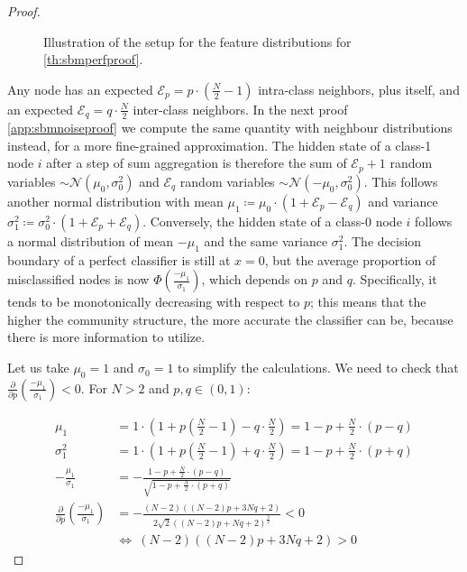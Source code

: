 \begin{proof}
\begin{figure}[ht]
{
			\label{fig:cumulativefunct}}
            \caption{Illustration of the setup for the feature distributions for \autoref{th:sbmperfproof}.}
	\end{figure}
	
	Any node has an expected $\mathcal{E}_p=p\cdot\left(\frac{N}{2}-1\right)$ intra-class neighbors, plus itself, and an expected $\mathcal{E}_q=q\cdot\frac{N}{2}$ inter-class neighbors. In the next proof \ref{app:sbmnoiseproof} we compute the same quantity with neighbour distributions instead, for a more fine-grained approximation. The hidden state of a class-1 node $i$ after a step of sum aggregation is therefore the sum of $\mathcal{E}_p + 1$ random variables $\sim\mathcal{N}(\mu_0,\sigma_0^2)$ and $\mathcal{E}_q$ random variables $\sim\mathcal{N}(-\mu_0,\sigma_0^2)$. This follows another normal distribution with mean $\mu_1\coloneqq \mu_0\cdot(1+\mathcal{E}_p-\mathcal{E}_q)$ and variance $\sigma_1^2\coloneqq\sigma_0^2\cdot(1+\mathcal{E}_p+\mathcal{E}_q)$. Conversely, the hidden state of a class-0 node $i$ follows a normal distribution of mean $-\mu_1$ and the same variance $\sigma_1^2$.
	The decision boundary of a perfect classifier is still at $x=0$, but the average proportion of misclassified nodes is now $\Phi(\frac{-\mu_1}{\sigma_1})$, which depends on $p$ and $q$. Specifically, it tends to be monotonically decreasing with respect to $p$; this means that the higher the community structure, the more accurate the classifier can be, because there is more information to utilize.
	
	Let us take $\mu_0=1$ and $\sigma_0=1$ to simplify the calculations. We need to check that $\frac{\partial}{\partial p}\left(\frac{-\mu_1}{\sigma_1} \right) < 0$. For $N > 2$ and $p,q\in(0,1)$:
	
	\begin{align*}
		\mu_1 &= 1\cdot(1+p\left(\frac{N}{2}-1\right)-q\cdot\frac{N}{2}) = 1-p+\frac{N}{2}\cdot(p-q) \\
		\sigma_1^2 &= 1\cdot(1+p\left(\frac{N}{2}-1\right)+q\cdot\frac{N}{2}) = 1-p+\frac{N}{2}\cdot(p+q) \\
		-\frac{\mu_1}{\sigma_1} &= -\frac{1-p+\frac{N}{2}\cdot(p-q)}{\sqrt{1-p+\frac{N}{2}\cdot(p+q)}}
		\\
		\frac{\partial}{\partial p}\left(\frac{-\mu_1}{\sigma_1} \right) &=
		-\frac{(N - 2)((N - 2)p + 3Nq + 2)}{2\sqrt{2}\left((N - 2)p + Nq + 2\right)^{\frac{3}{2}}}
		< 0
		\\
		&\Longleftrightarrow\ (N - 2)((N - 2)p + 3Nq + 2) > 0
	\end{align*}
	

\end{proof}
